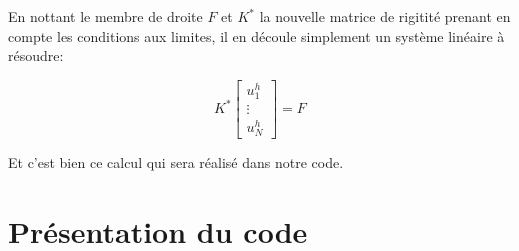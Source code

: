 \documentclass{article}
\begin{document}
En nottant le membre de droite $F$ et $K^*$ la nouvelle
matrice de rigitité prenant en compte les conditions aux limites,
il en découle simplement un système linéaire à résoudre:

\begin{equation}
    K^*
    \begin{bmatrix}
        u^h_1 \\ \vdots \\ u^h_N
    \end{bmatrix}
    = F
\end{equation}

Et c'est bien ce calcul qui sera réalisé dans notre code.

\section{Présentation du code}
\end{document}

